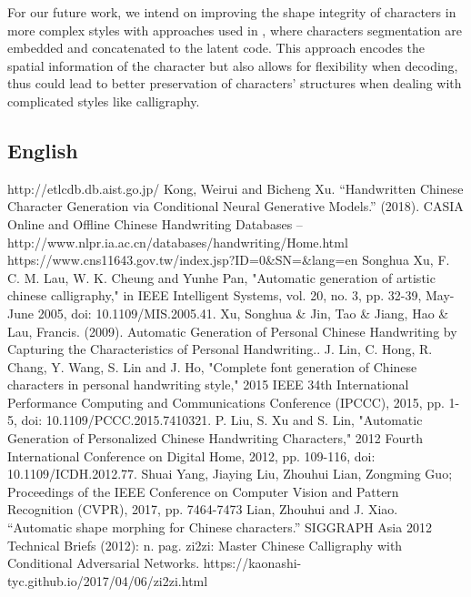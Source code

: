 \documentclass[12pt]{report}
\begin{document}
For our future work, we intend on improving the shape integrity of characters in more complex styles with approaches used in \cite{dense-ran}\cite{calligan}, where characters segmentation are embedded and concatenated to the latent code. This approach encodes the spatial information of the character but also allows for flexibility when decoding, thus could lead to better preservation of characters' structures when dealing with complicated styles like calligraphy.

\begin{thebibliography}{9}
\section*{English}
	 http://etlcdb.db.aist.go.jp/
	 Kong, Weirui and Bicheng Xu. “Handwritten Chinese Character Generation via Conditional Neural Generative Models.” (2018).
	 CASIA Online and Offline Chinese Handwriting Databases – http://www.nlpr.ia.ac.cn/databases/handwriting/Home.html
	 https://www.cns11643.gov.tw/index.jsp?ID=0\&SN=\&lang=en
	 Songhua Xu, F. C. M. Lau, W. K. Cheung and Yunhe Pan, "Automatic generation of artistic chinese calligraphy," in IEEE Intelligent Systems, vol. 20, no. 3, pp. 32-39, May-June 2005, doi: 10.1109/MIS.2005.41.
	 Xu, Songhua \& Jin, Tao \& Jiang, Hao \& Lau, Francis. (2009). Automatic Generation of Personal Chinese Handwriting by Capturing the Characteristics of Personal Handwriting.. 
	 J. Lin, C. Hong, R. Chang, Y. Wang, S. Lin and J. Ho, "Complete font generation of Chinese characters in personal handwriting style," 2015 IEEE 34th International Performance Computing and Communications Conference (IPCCC), 2015, pp. 1-5, doi: 10.1109/PCCC.2015.7410321.
	 P. Liu, S. Xu and S. Lin, "Automatic Generation of Personalized Chinese Handwriting Characters," 2012 Fourth International Conference on Digital Home, 2012, pp. 109-116, doi: 10.1109/ICDH.2012.77.
	Shuai Yang, Jiaying Liu, Zhouhui Lian, Zongming Guo; Proceedings of the IEEE Conference on Computer Vision and Pattern Recognition (CVPR), 2017, pp. 7464-7473 
	 Lian, Zhouhui and J. Xiao. “Automatic shape morphing for Chinese characters.” SIGGRAPH Asia 2012 Technical Briefs (2012): n. pag.
	 zi2zi: Master Chinese Calligraphy with Conditional Adversarial Networks. https://kaonashi-tyc.github.io/2017/04/06/zi2zi.html

\end{thebibliography}
\end{document}
